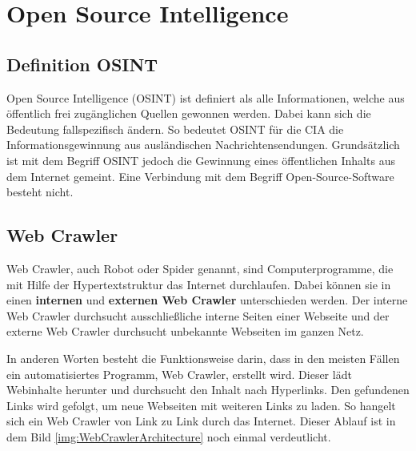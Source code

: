\section{Open Source Intelligence}
	\subsection{Definition OSINT}
	Open Source Intelligence (OSINT) ist definiert als alle Informationen, welche aus öffentlich frei zugänglichen Quellen gewonnen werden. Dabei kann sich die Bedeutung fallspezifisch ändern. So bedeutet OSINT für die CIA die Informationsgewinnung aus ausländischen Nachrichtensendungen. Grundsätzlich ist mit dem Begriff OSINT jedoch die Gewinnung eines öffentlichen Inhalts aus dem Internet gemeint. Eine Verbindung mit dem Begriff Open-Source-Software besteht nicht.\cite{Bazzell}\\

	\subsection{Web Crawler}
		Web Crawler, auch Robot oder Spider genannt, sind Computerprogramme, die mit Hilfe der Hypertextstruktur das Internet durchlaufen. \cite{thelwall2001web} Dabei können sie in einen \textbf{internen} und \textbf{externen Web Crawler} unterschieden werden. Der interne Web Crawler durchsucht ausschließliche interne Seiten einer Webseite und der externe Web Crawler durchsucht unbekannte Webseiten im ganzen Netz. \cite{sharma2012study}

		In anderen Worten besteht die Funktionsweise darin, dass in den meisten Fällen ein automatisiertes Programm, Web Crawler, erstellt wird. Dieser lädt Webinhalte herunter und durchsucht den Inhalt nach Hyperlinks. Den gefundenen Links wird gefolgt, um neue Webseiten mit weiteren Links zu laden. So hangelt sich ein Web Crawler von Link zu Link durch das Internet.\cite{WebScraping} Dieser Ablauf ist in dem Bild \ref{img:WebCrawlerArchitecture} noch einmal verdeutlicht.
		

